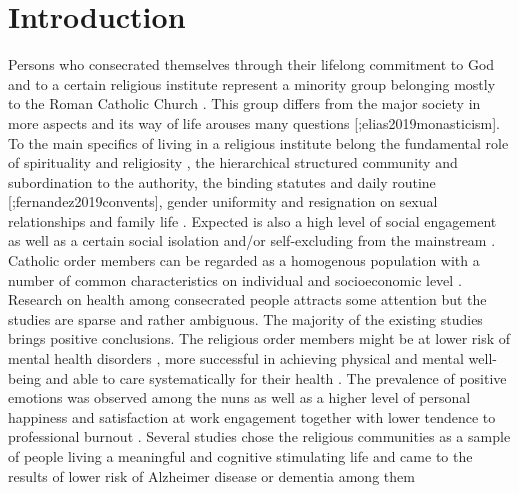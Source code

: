 \documentclass[ijerph,article,accept,moreauthors,pdftex]{mdpi}
\begin{document}

\hypertarget{introduction}{%
\section{Introduction}\label{introduction}}

Persons who consecrated themselves through their lifelong commitment to
God and to a certain religious institute represent a minority group
belonging mostly to the Roman Catholic Church
\citep{holtz2006geschichte, frank1988geschichte}. This group differs
from the major society in more aspects and its way of life arouses many
questions {[}\citet{cist2019living};elias2019monasticism{]}. To the main
specifics of living in a religious institute belong the fundamental role
of spirituality \citep{bussing2017validation} and religiosity
\citep{quartier2017monastic}, the hierarchical structured community and
subordination to the authority, the binding statutes and daily routine
{[}\citet{wrobel2018duties};fernandez2019convents{]}, gender uniformity
and resignation on sexual relationships and family life
\citep{huel2018missionaries}. Expected is also a high level of social
engagement \citep{bickerton2013spiritual} as well as a certain social
isolation and/or self-excluding from the mainstream
\citep{jewdokimow2019transcending, meawad2020sexuality}. Catholic order
members can be regarded as a homogenous population with a number of
common characteristics on individual and socioeconomic level
\citep{bowen2018community}.\\
Research on health among consecrated people attracts some attention but
the studies are sparse and rather ambiguous. The majority of the
existing studies brings positive conclusions. The religious order
members might be at lower risk of mental health disorders
\citep{rogowska2020investigating}, more successful in achieving physical
and mental well-being \citep{corwin2014lord} and able to care
systematically for their health \citep{huck1996health}. The prevalence
of positive emotions was observed among the nuns
\citep{skrzypinska2012intricacies} as well as a higher level of personal
happiness \citep{francis2018happiness} and satisfaction at work
engagement \citep{ariza2018work} together with lower tendence to
professional burnout \citep{chirico2020spirituality}. Several studies
chose the religious communities as a sample of people living a
meaningful and cognitive stimulating life and came to the results of
lower risk of Alzheimer disease or dementia among them
\end{document}
